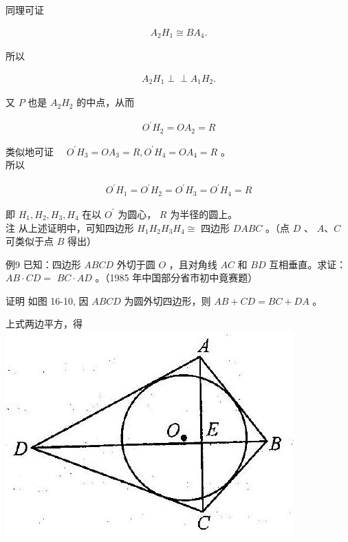 \documentclass[10pt]{article}
\def\Perp{\perp\!\!\!\perp}
\begin{document}
同理可证

\begin{align*}
A_{2} H_{1} \cong B A_{4} .
\end{align*}

所以

\begin{align*}
A_{2} H_{1} \Perp A_{1} H_{2} .
\end{align*}

又 $P$ 也是 $A_{2} H_{2}$ 的中点，从而

\begin{align*}
O^{\prime} H_{2}=O A_{2}=R
\end{align*}

类似地可证 $\quad O^{\prime} H_{3}=O A_{3}=R, O^{\prime} H_{4}=O A_{4}=R$ 。\\
所以

\begin{align*}
O^{\prime} H_{1}=O^{\prime} H_{2}=O^{\prime} H_{3}=O^{\prime} H_{4}=R
\end{align*}

即 $H_{1}, H_{2}, H_{3}, H_{4}$ 在以 $O^{\prime}$ 为圆心， $R$ 为半径的圆上。\\
注 从上述证明中，可知四边形 $H_{1} H_{2} H_{3} H_{4} \cong$ 四边形 $D A B C$ 。（点 $D$ 、 $A 、 C$ 可类似于点 $B$ 得出）

例9 已知：四边形 $A B C D$ 外切于圆 $O$ ，且对角线 $A C$ 和 $B D$ 互相垂直。求证： $A B \cdot C D=$ $B C \cdot A D$ 。（1985 年中国部分省市初中竟赛题）

证明 如图 16-10, 因 $A B C D$ 为圆外切四边形，则 $A B+C D=B C+D A$ 。

上式两边平方，得\\
\includegraphics[max width=\textwidth, center]{2024_10_30_2c8f45efd4a519b08e1ag-152}
\end{document}
